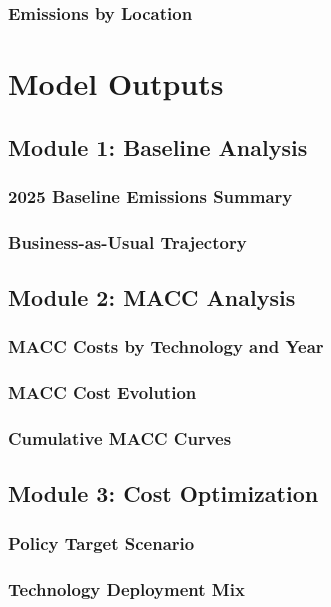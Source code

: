 \documentclass[11pt,a4paper]{report}
\begin{document}
\section{Emissions by Location}

\part{Model Outputs}
\label{part:outputs}

\chapter{Module 1: Baseline Analysis}

\section{2025 Baseline Emissions Summary}
\section{Business-as-Usual Trajectory}

\chapter{Module 2: MACC Analysis}

\section{MACC Costs by Technology and Year}
\section{MACC Cost Evolution}
\section{Cumulative MACC Curves}

\chapter{Module 3: Cost Optimization}

\section{Policy Target Scenario}
\section{Technology Deployment Mix}
\end{document}
